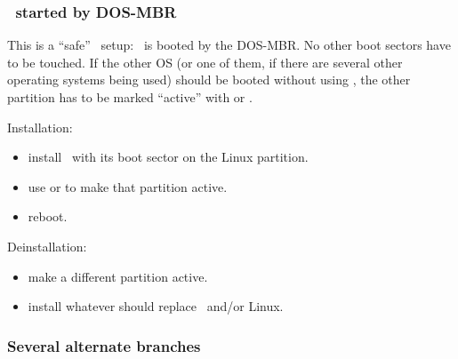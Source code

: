 \subsubsection{\LILO\ started by DOS-MBR}


This is a ``safe'' \LILO\ setup: \LILO\ is booted by the DOS-MBR. No other boot
sectors have to be touched. If the other OS (or one of them, if there are
several other operating systems being used) should be booted without
using \LILO, the other
partition has to be marked ``active'' with  or .

Installation:
\begin{itemize}
  \item install \LILO\ with its boot sector on the Linux partition.
  \item use  or  to make that partition active.
  \item reboot.
\end{itemize}

Deinstallation:
\begin{itemize}
  \item make a different partition active.
  \item install whatever should replace \LILO\ and/or Linux.
\end{itemize}


\subsubsection{Several alternate branches}


